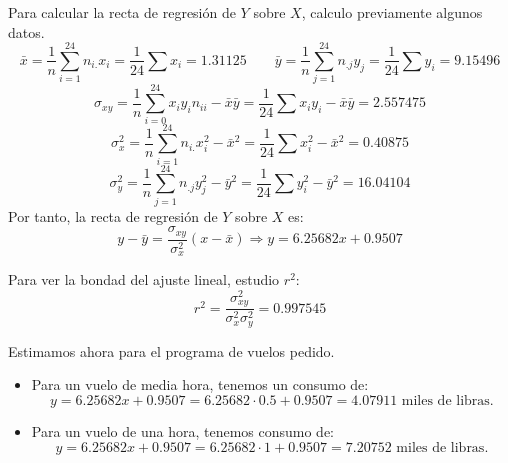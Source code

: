 \begin{ejercicio}
\begin{enumerate}
        Para calcular la recta de regresión de $Y$ sobre $X$, calculo previamente algunos datos.
        \begin{equation*}
            \bar{x} = \frac{1}{n} \sum_{i=1}^{24} n_{i.}x_i = \frac{1}{24} \sum x_i = 1.31125
            \qquad
            \bar{y} = \frac{1}{n} \sum_{j=1}^{24} n_{.j}y_j = \frac{1}{24} \sum y_i = 9.15496
        \end{equation*}
        \begin{equation*}
            \sigma_{xy} = \frac{1}{n}\sum_{i=0}^{24} x_iy_in_{ii} -\bar{x}\bar{y} = \frac{1}{24}\sum x_iy_i -\bar{x}\bar{y} = 2.557475
        \end{equation*}
        \begin{equation*}
            \sigma_x^2 = \frac{1}{n} \sum_{i=1}^{24} n_{i.}x_i^2 -\bar{x}^2 = \frac{1}{24} \sum x_i^2 -\bar{x}^2 = 0.40875
        \end{equation*}
        \begin{equation*}
            \sigma_y^2 = \frac{1}{n} \sum_{j=1}^{24} n_{.j}y_j^2 -\bar{y}^2 = \frac{1}{24} \sum y_i^2 -\bar{y}^2 = 16.04104
        \end{equation*}
        Por tanto, la recta de regresión de $Y$ sobre $X$ es:
        \begin{equation*}
            y-\bar{y} = \frac{\sigma_{xy}}{\sigma_x^2} (x-\bar{x}) \Longrightarrow
            y = 6.25682x +0.9507
        \end{equation*}

        Para ver la bondad del ajuste lineal, estudio $r^2$:
        \begin{equation*}
            r^2 = \frac{\sigma_{xy}^2}{\sigma_x^2 \sigma_y^2} = 0.997545
        \end{equation*}
        
        Estimamos ahora para el programa de vuelos pedido.
        \begin{itemize}
            \item Para un vuelo de media hora, tenemos un consumo de:
            \begin{equation*}
                y = 6.25682x +0.9507 = 6.25682\cdot 0.5 +0.9507 = 4.07911 \text{ miles de libras.}
            \end{equation*}

            \item Para un vuelo de una hora, tenemos consumo de:
            \begin{equation*}
                y = 6.25682x +0.9507 = 6.25682\cdot 1 +0.9507 = 7.20752 \text{ miles de libras.}
            \end{equation*}


\end{itemize}
\end{enumerate}
\end{ejercicio}
